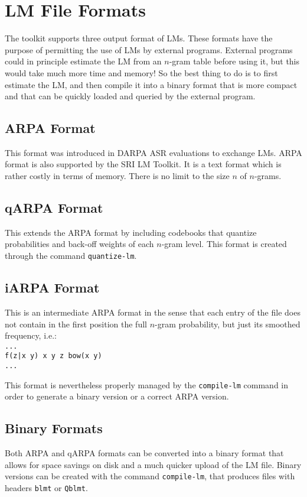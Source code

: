 \documentclass[11pt]{article}
\begin{document}
\newpage
\section{LM File Formats}
The toolkit supports three output format of LMs. These formats have the
purpose of permitting  the use of LMs by  external programs.  External
programs could in principle estimate the LM from an $n$-gram table before
using it, but this would take much more time and memory! So the best thing
to do is to first  estimate the LM, and then compile it into a binary format   
that is more compact and that can be quickly loaded and queried by the 
external program.


\subsection{ARPA Format}
This format was  introduced in DARPA ASR evaluations  to exchange LMs.
ARPA format  is also  supported by the  SRI LM  Toolkit. It is  a text
format which is rather costly in terms of memory. There is no limit to
the size $n$ of $n$-grams.

\subsection{qARPA Format}
This extends the ARPA format by including codebooks that quantize 
probabilities and back-off weights of each $n$-gram level. This format
is created through the command {\tt quantize-lm}.

\subsection{iARPA Format}
This is an intermediate ARPA format in the sense that each entry of the file
does not contain in the first position the full $n$-gram probability, but just its
smoothed frequency, i.e.:\\
\noindent
{\tt ...\\
f(z|x y) x y z bow(x y)\\
...
}

\noindent
This format is nevertheless properly managed by the {\tt compile-lm} command
in order to generate a binary version or a correct ARPA version.


\subsection{Binary Formats}
Both ARPA and qARPA formats can be converted into a binary format 
that allows for space savings on disk and a much quicker upload of
the LM file.  Binary versions can be created with the command 
{\tt compile-lm}, that produces files with  headers {\tt blmt} or {\tt Qblmt}.
\end{document}
